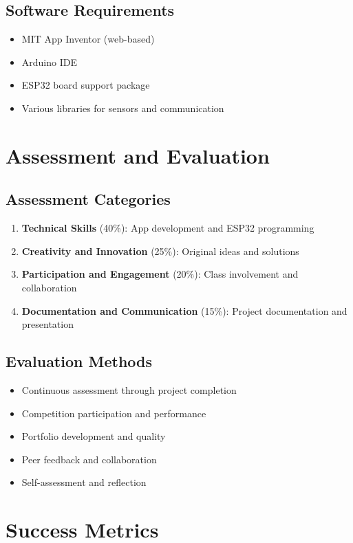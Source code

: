 \documentclass[12pt,a4paper]{article}
\begin{document}
\subsection{Software Requirements}
\begin{itemize}
    \item MIT App Inventor (web-based)
    \item Arduino IDE
    \item ESP32 board support package
    \item Various libraries for sensors and communication
\end{itemize}

\section{Assessment and Evaluation}

\subsection{Assessment Categories}
\begin{enumerate}
    \item \textbf{Technical Skills} (40\%): App development and ESP32 programming
    \item \textbf{Creativity and Innovation} (25\%): Original ideas and solutions
    \item \textbf{Participation and Engagement} (20\%): Class involvement and collaboration
    \item \textbf{Documentation and Communication} (15\%): Project documentation and presentation
\end{enumerate}

\subsection{Evaluation Methods}
\begin{itemize}
    \item Continuous assessment through project completion
    \item Competition participation and performance
    \item Portfolio development and quality
    \item Peer feedback and collaboration
    \item Self-assessment and reflection
\end{itemize}

\section{Success Metrics}
\end{document}
